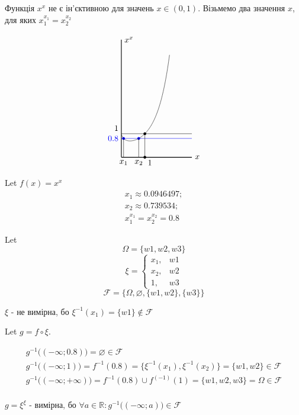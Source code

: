 \documentclass[11pt, a4paper]{article} %
\begin{document}
Функція $x^x$ не є ін'єктивною для значень $x\in(0,1)$.
Візьмемо два значення $x$, для яких $x_1^{x_1} = x_2^{x_2}$

$$
\begin{tikzpicture}
    \draw[thick] (0,0) -- (3,0) node[right] {$x$};
    \draw[thick] (0,0) -- (0,5) node[right] {$x^x$};
    \draw[thin] (0,1) node[above left] {$1$} -- (3,1);
    \draw[thin, blue] (0,0.8) node[left] {$0.8$} -- (3,0.8);
    \fill[blue] (0.0946497,0.8) circle (0.06cm);
    \fill[blue] (0.739534,0.8) circle (0.06cm);
    \draw[thin] (0.0946497,0) node[below] {$x_1$} -- (0.0946497,0.8);
    \draw[thin] (0.739534,0) node[below] {$x_2$} -- (0.739534,0.8);
    \draw[thin] (1,0) node[below right] {$1$} -- (1,1);
    \fill[black] (1,1) circle (0.06cm);
    \fill[black] (1,0) circle (0.06cm);

    \draw plot[%
        scale=1,
        samples=100,
        domain=0.01:2.05,
    ] (\x,{(\x)^(\x)});
\end{tikzpicture}
$$



Let $f(x) = x^x$
$$
\begin{gathered}
    x_1 \approx 0.0946497; \\
    x_2 \approx 0.739534; \\
    x_1^{x_1} = x_2^{x_2} = 0.8
\end{gathered}
$$


Let 
$$
\Omega = \{w1, w2, w3\}$$
$$
\xi = \begin{cases}
    x_1,& w1\\
    x_2,& w2\\
    1,& w3    
\end{cases}
$$
$$
\mathcal F = \{\Omega, \varnothing, \{w1,w2\}, \{w3\}\}
$$

$\xi$ - не вимірна, бо $\xi^{-1} (x_1) = \{w1\} \notin \mathcal F$

Let $g = f \circ \xi$. 

$$
\begin{gathered}
    g^{-1}\bigl((-\infty; 0.8)\bigr) = \varnothing \in \mathcal F\\
    g^{-1}\bigl((-\infty; 1)\bigr) = f^{-1}(0.8) = \{\xi^{-1}(x_1), \xi^{-1}(x_2)\} = \{w1,w2\} \in \mathcal F\\
    g^{-1}\bigl((-\infty; +\infty)\bigr) = f^{-1}(0.8) \cup f^(-1)(1) = \{ w1, w2, w3 \} = \Omega \in \mathcal F\\
\end{gathered}
$$

$g = \xi^\xi$ - вимірна, бо $\forall a\in\mathbb R : g^{-1}\bigl((-\infty;a)\bigr) \in \mathcal F$
\end{document}
